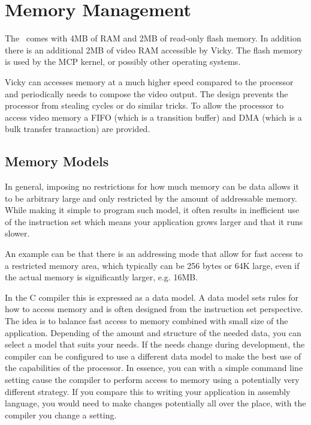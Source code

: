 \chapter{Memory Management}

The \foenix\ comes with 4MB of RAM and 2MB of read-only flash
memory. In addition there is an additional 2MB of video RAM accessible by
Vicky.
The flash memory is used by the MCP kernel, or possibly other
operating systems.

Vicky can accesses memory at a much higher speed compared to the
processor and periodically needs to compose the video output. The
design prevents the processor from stealing cycles or do similar
tricks. To allow the processor to access video memory a FIFO (which is
a transition buffer) and DMA (which is a bulk transfer transaction)
are provided.


\section*{Memory Models}

In general, imposing no restrictions for how much memory can be data
allows it to be arbitrary large and only restricted by the amount of
addressable memory. While making it simple to program such model, it
often results in inefficient use of the instruction set which means
your application grows larger and that it runs slower.

An example can be that there is an addressing mode that allow for fast
access to a restricted memory area, which typically can be 256 bytes
or 64K large, even if the actual memory is significantly larger,
e.g. 16MB.

In the C compiler this is expressed as a data model. A data model sets
rules for how to access memory and is often designed from the
instruction set perspective. The idea is to balance fast access to
memory combined with small size of the application. Depending of the
amount and structure of the needed data, you can select a model that
suits your needs. If the needs change during development, the compiler
can be configured to use a different data model to make the best use
of the capabilities of the processor. In essence, you can with a
simple command line setting cause the compiler to perform access to
memory using a potentially very different strategy. If you compare
this to writing your application in assembly language, you would need
to make changes potentially all over the place, with the compiler you
change a setting.

